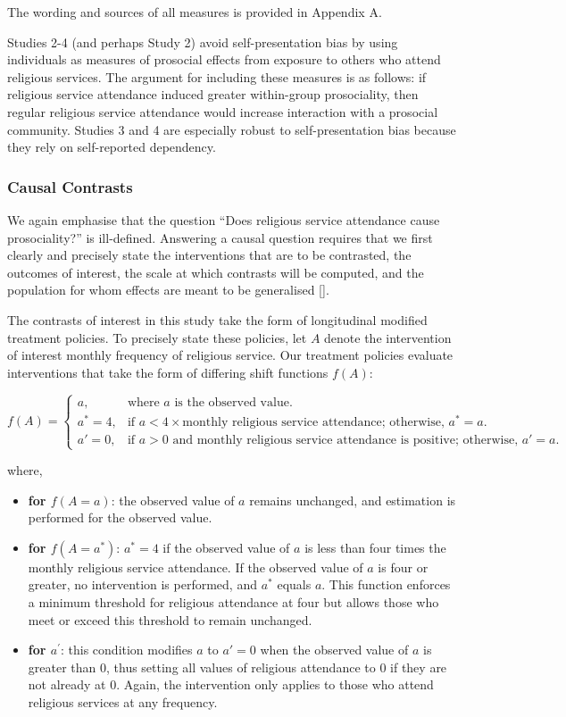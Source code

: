 \documentclass[
  singlecolumn]{article}
\begin{document}
The wording and sources of all measures is provided in Appendix A.

Studies 2-4 (and perhaps Study 2) avoid self-presentation bias by using
individuals as measures of prosocial effects from exposure to others who
attend religious services. The argument for including these measures is
as follows: if religious service attendance induced greater within-group
prosociality, then regular religious service attendance would increase
interaction with a prosocial community. Studies 3 and 4 are especially
robust to self-presentation bias because they rely on self-reported
dependency.

\subsubsection{Causal Contrasts}\label{causal-contrasts}

We again emphasise that the question ``Does religious service attendance
cause prosociality?'' is ill-defined. Answering a causal question
requires that we first clearly and precisely state the interventions
that are to be contrasted, the outcomes of interest, the scale at which
contrasts will be computed, and the population for whom effects are
meant to be generalised {[}{]}.

The contrasts of interest in this study take the form of longitudinal
modified treatment policies. To precisely state these policies, let
\(A\) denote the intervention of interest monthly frequency of religious
service. Our treatment policies evaluate interventions that take the
form of differing shift functions \(f(A)\):

\[
f(A) = 
\begin{cases} 
a, & \text{where } a \text{ is the observed value.}\\
a^* = 4, & \text{if } a < 4 \times \text{monthly religious service attendance; otherwise, } a^* = a.\\
a' = 0, & \text{if } a > 0 \text{ and monthly religious service attendance is positive; otherwise, } a' = a. 
\end{cases}
\]

where,

\begin{itemize}
\item
  \textbf{for \(f(A=a)\)}: the observed value of \(a\) remains
  unchanged, and estimation is performed for the observed value.
\item
  \textbf{for \(f(A =a^*)\)}: \(a^* = 4\) if the observed value of \(a\)
  is less than four times the monthly religious service attendance. If
  the observed value of \(a\) is four or greater, no intervention is
  performed, and \(a^*\) equals \(a\). This function enforces a minimum
  threshold for religious attendance at four but allows those who meet
  or exceed this threshold to remain unchanged.
\item
  \textbf{for \(a^\prime\)}: this condition modifies \(a\) to \(a' = 0\)
  when the observed value of \(a\) is greater than 0, thus setting all
  values of religious attendance to 0 if they are not already at 0.
  Again, the intervention only applies to those who attend religious
  services at any frequency.
\end{itemize}
\end{document}
